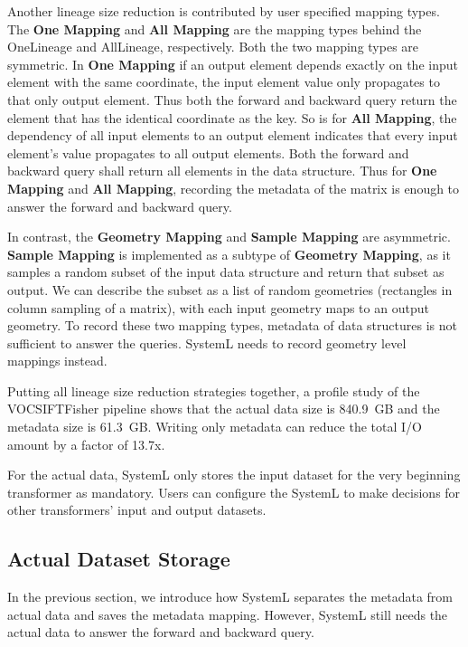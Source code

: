 \documentclass{sig-alternate}
\begin{document}
Another lineage size reduction is contributed by user specified mapping types. 
The {\bf One Mapping} and {\bf All Mapping} are the mapping types behind the OneLineage and AllLineage, respectively.
Both the two mapping types are symmetric.
In {\bf One Mapping} if an output element depends exactly on the input element with the same coordinate, 
the input element value only propagates to that only output element. 
Thus both the forward and backward query return the element that has the identical coordinate as the key.
So is for {\bf All Mapping}, the dependency of all input elements to an output element indicates that every input element's value propagates to all output elements.
Both the forward and backward query shall return all elements in the data structure.
Thus for {\bf One Mapping} and {\bf All Mapping}, recording the metadata of the matrix is enough to answer the forward and backward query.

In contrast, the {\bf Geometry Mapping} and {\bf Sample Mapping} are asymmetric. 
{\bf Sample Mapping} is implemented as a subtype of {\bf Geometry Mapping}, as it samples a random subset of the input data structure and return that subset as output.
We can describe the subset as a list of random geometries (rectangles in column sampling of a matrix), with each input geometry maps to an output geometry.
To record these two mapping types, metadata of data structures is not sufficient to answer the queries. 
SystemL needs to record geometry level mappings instead.

Putting all lineage size reduction strategies together, 
a profile study of the VOCSIFTFisher pipeline shows that the actual data size is 840.9~GB and the metadata size is 61.3~GB. 
Writing only metadata can reduce the total I/O amount by a factor of 13.7x.

For the actual data, SystemL only stores the input dataset for the very beginning transformer as mandatory. 
Users can configure the SystemL to make decisions for other transformers' input and output datasets.




\subsection{Actual Dataset Storage}
In the previous section, we introduce how SystemL separates the metadata from actual data and saves the metadata mapping.
However, SystemL still needs the actual data to answer the forward and backward query.
\end{document}
